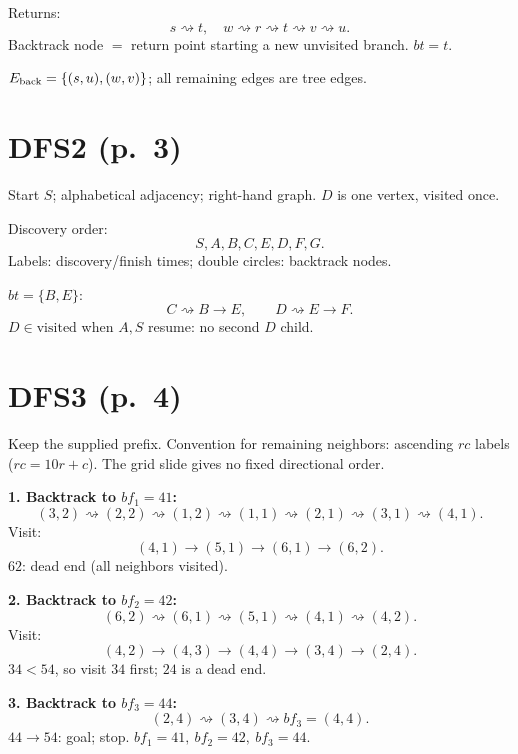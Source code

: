 \documentclass[11pt,a4paper]{article}
\newcommand{\question}[2]{\section*{#1}}
\begin{document}
Returns:
\[
s\rightsquigarrow t,\quad w\rightsquigarrow r\rightsquigarrow t\rightsquigarrow v\rightsquigarrow u.
\]
Backtrack node $=$ return point starting a new unvisited branch. $\boxed{bt=t}$.

$E_{\rm back}=\{(s,u),(w,v)\}$; all remaining edges are tree edges.

\newpage
\question{DFS2 (p.\ 3)}{Discovery and finish times}
Start $S$; alphabetical adjacency; right-hand graph. $D$ is one vertex, visited once.

Discovery order:
\[
\boxed{S,A,B,C,E,D,F,G}.
\]
Labels: discovery/finish times; double circles: backtrack nodes.
\begin{center}\end{center}
$\boxed{bt=\{B,E\}}$:
\[
C\rightsquigarrow B\to E,\qquad D\rightsquigarrow E\to F.
\]
$D\in\mathrm{visited}$ when $A,S$ resume: no second $D$ child.

\newpage
\question{DFS3 (p.\ 4)}{Continue after the dead end}
Keep the supplied prefix. Convention for remaining neighbors: ascending $rc$ labels ($rc=10r+c$). The grid slide gives no fixed directional order.

\textbf{1. Backtrack to $bf_1=41$:}
\[
(3,2)\rightsquigarrow(2,2)\rightsquigarrow(1,2)\rightsquigarrow(1,1)
\rightsquigarrow(2,1)\rightsquigarrow(3,1)\rightsquigarrow(4,1).
\]
Visit:
\[
(4,1)\to(5,1)\to(6,1)\to(6,2).
\]
$62$: dead end (all neighbors visited).

\textbf{2. Backtrack to $bf_2=42$:}
\[
(6,2)\rightsquigarrow(6,1)\rightsquigarrow(5,1)\rightsquigarrow(4,1)\rightsquigarrow(4,2).
\]
Visit:
\[
(4,2)\to(4,3)\to(4,4)\to(3,4)\to(2,4).
\]
$34<54$, so visit $34$ first; $24$ is a dead end.

\textbf{3. Backtrack to $bf_3=44$:}
\[
(2,4)\rightsquigarrow(3,4)\rightsquigarrow\boxed{bf_3=(4,4)}.
\]
$44\to54$: goal; stop. $\boxed{bf_1=41,\ bf_2=42,\ bf_3=44}$.
\end{document}
